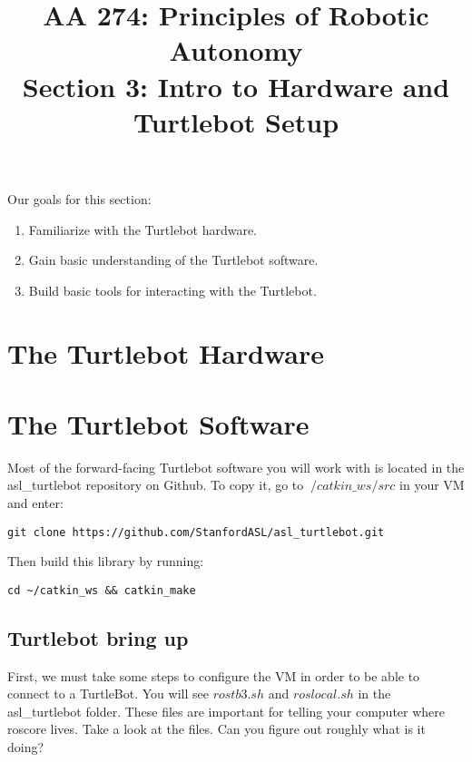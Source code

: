 \documentclass{article}
\title{AA 274: Principles of Robotic Autonomy \\ Section 3: Intro to Hardware and Turtlebot Setup}
\date{}
\begin{document}
\maketitle
\pagestyle{fancy}

Our goals for this section: \begin{enumerate}
	\item Familiarize with the Turtlebot hardware.
	\item Gain basic understanding of the Turtlebot software.
	\item Build basic tools for interacting with the Turtlebot.
\end{enumerate}

\section{The Turtlebot Hardware}


\section{The Turtlebot Software}

Most of the forward-facing Turtlebot software you will work with is located in the asl\_turtlebot repository on Github. To copy it, go to $~/catkin\_ws/src$ in your VM and enter:

\begin{lstlisting}
git clone https://github.com/StanfordASL/asl_turtlebot.git
\end{lstlisting}

Then build this library by running:

\begin{lstlisting}
cd ~/catkin_ws && catkin_make
\end{lstlisting}

\subsection{Turtlebot bring up}
First, we must take some steps to configure the VM in order to be able to connect to a TurtleBot. You
will see $rostb3.sh$ and $roslocal.sh$ in the asl\_turtlebot folder. These files are important for telling your computer where roscore lives. Take a look at the files. Can you figure out roughly what is it doing?
\end{document}
